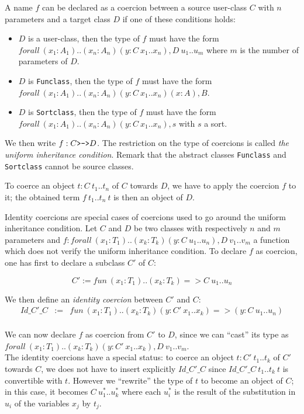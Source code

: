   A name $f$ can be declared as a coercion between a source user-class
$C$ with $n$ parameters and a target class $D$ if one of these
conditions holds:

\newcommand{\oftype}{\!:\!}

\begin{itemize}
\item $D$ is a user-class, then the type of $f$ must have the form
      $forall~ (x_1 \oftype A_1)..(x_n \oftype A_n)(y\oftype C~x_1..x_n), D~u_1..u_m$ where $m$
      is the number of parameters of $D$.
\item $D$ is {\tt Funclass}, then the type of $f$ must have the form
      $forall~ (x_1\oftype A_1)..(x_n\oftype A_n)(y\oftype C~x_1..x_n)(x:A), B$. 
\item $D$ is {\tt Sortclass}, then the type of $f$ must have the form
      $forall~ (x_1\oftype A_1)..(x_n\oftype A_n)(y\oftype C~x_1..x_n), s$ with $s$ a sort. 
\end{itemize}

We then write $f:C \mbox{\texttt{>->}} D$. The restriction on the type
of coercions is called {\em the uniform inheritance condition}.
Remark that the abstract classes {\tt Funclass} and {\tt Sortclass}
cannot be source classes.

To coerce an object $t:C~t_1..t_n$ of $C$ towards $D$, we have to
apply the coercion $f$ to it; the obtained term $f~t_1..t_n~t$ is
then an object of $D$.


  Identity coercions are special cases of coercions used to go around
the uniform inheritance condition.  Let $C$ and $D$ be two classes
with respectively $n$ and $m$ parameters and
$f:forall~(x_1:T_1)..(x_k:T_k)(y:C~u_1..u_n), D~v_1..v_m$ a function which
does not verify the uniform inheritance condition. To declare $f$ as
coercion, one has first to declare a subclass $C'$ of $C$:

$$C' := fun~ (x_1:T_1)..(x_k:T_k) => C~u_1..u_n$$

\noindent We then define an {\em identity coercion} between $C'$ and $C$:
\begin{eqnarray*}
Id\_C'\_C  & := & fun~ (x_1:T_1)..(x_k:T_k)(y:C'~x_1..x_k) => (y:C~u_1..u_n)\\
\end{eqnarray*}

We can now declare $f$ as coercion from $C'$ to $D$, since we can
``cast'' its type as
$forall~ (x_1:T_1)..(x_k:T_k)(y:C'~x_1..x_k),D~v_1..v_m$.\\ The identity
coercions have a special status: to coerce an object $t:C'~t_1..t_k$
of $C'$ towards $C$, we does not have to insert explicitly $Id\_C'\_C$
since $Id\_C'\_C~t_1..t_k~t$ is convertible with $t$.  However we
``rewrite'' the type of $t$ to become an object of $C$; in this case,
it becomes $C~u_1^*..u_k^*$ where each $u_i^*$ is the result of the
substitution in $u_i$ of the variables $x_j$ by $t_j$.


